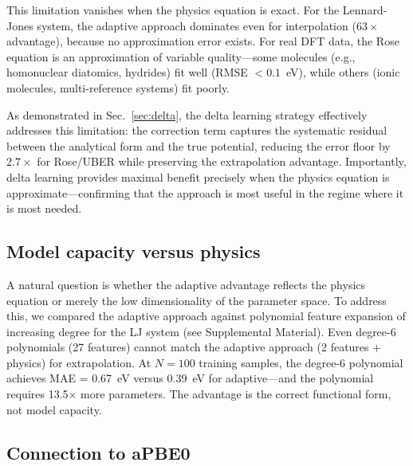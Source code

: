 \documentclass[aps,prb,twocolumn,superscriptaddress,longbibliography,floatfix]{revtex4-2}
\begin{document}
This limitation vanishes when the physics equation is exact. For the Lennard-Jones system, the adaptive approach dominates even for interpolation ($63\times$ advantage), because no approximation error exists. For real DFT data, the Rose equation is an approximation of variable quality---some molecules (e.g., homonuclear diatomics, hydrides) fit well (RMSE $< 0.1$~eV), while others (ionic molecules, multi-reference systems) fit poorly.

As demonstrated in Sec.~\ref{sec:delta}, the delta learning strategy effectively addresses this limitation: the correction term captures the systematic residual between the analytical form and the true potential, reducing the error floor by $2.7\times$ for Rose/UBER while preserving the extrapolation advantage. Importantly, delta learning provides maximal benefit precisely when the physics equation is approximate---confirming that the approach is most useful in the regime where it is most needed.

\subsection{Model capacity versus physics}
\label{sec:capacity}

A natural question is whether the adaptive advantage reflects the physics equation or merely the low dimensionality of the parameter space. To address this, we compared the adaptive approach against polynomial feature expansion of increasing degree for the LJ system (see Supplemental Material). Even degree-6 polynomials (27 features) cannot match the adaptive approach (2 features $+$ physics) for extrapolation. At $N = 100$ training samples, the degree-6 polynomial achieves MAE = 0.67~eV versus 0.39~eV for adaptive---and the polynomial requires 13.5$\times$ more parameters. The advantage is the correct functional form, not model capacity.

\subsection{Connection to aPBE0}
\label{sec:apbe0}
\end{document}
